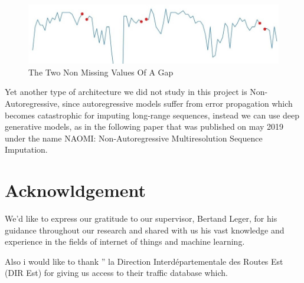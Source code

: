 \begin{figure}[h]
\centering
\includegraphics[scale=0.55]{img/extrapoalting.jpg}
\caption{The Two Non Missing Values Of A Gap}
\label{fig:extrapo}
\end{figure}

Yet another type of architecture we did not study in this project is Non-Autoregressive, since  autoregressive models  suffer from error propagation which becomes catastrophic for imputing long-range sequences, instead we can use  deep generative models, as in the following paper that was published on may 2019 under the name NAOMI: Non-Autoregressive Multiresolution Sequence Imputation\cite{naomi}.




\section{Acknowldgement}

We'd like to express our gratitude to our supervisor, Bertand Leger, for his guidance  throughout our research and shared with us his vast knowledge and
experience in the fields of internet of things and machine learning.

Also i would like to thank   '' la Direction Interdépartementale des Routes Est (DIR Est) for giving us access to their traffic database which. 


